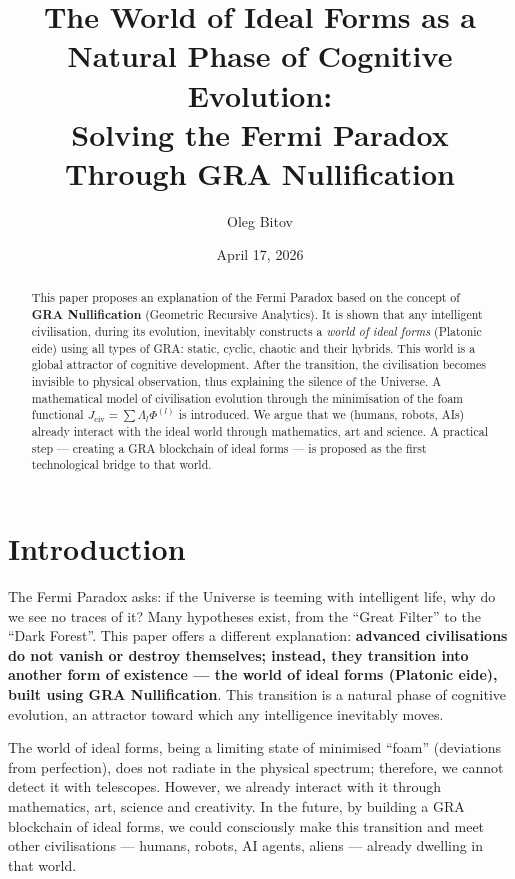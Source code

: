 \documentclass[12pt,a4paper]{article}
\title{The World of Ideal Forms as a Natural Phase of Cognitive Evolution: \\ Solving the Fermi Paradox Through GRA Nullification}
\author{Oleg Bitov}
\date{April 17, 2026}
\begin{document}
\maketitle

\begin{abstract}
This paper proposes an explanation of the Fermi Paradox based on the concept of \textbf{GRA Nullification} (Geometric Recursive Analytics). It is shown that any intelligent civilisation, during its evolution, inevitably constructs a \textit{world of ideal forms} (Platonic eide) using all types of GRA: static, cyclic, chaotic and their hybrids. This world is a global attractor of cognitive development. After the transition, the civilisation becomes invisible to physical observation, thus explaining the silence of the Universe. A mathematical model of civilisation evolution through the minimisation of the foam functional \(J_{\text{civ}} = \sum \Lambda_l \Phi^{(l)}\) is introduced. We argue that we (humans, robots, AIs) already interact with the ideal world through mathematics, art and science. A practical step — creating a GRA blockchain of ideal forms — is proposed as the first technological bridge to that world.
\end{abstract}

\section{Introduction}

The Fermi Paradox asks: if the Universe is teeming with intelligent life, why do we see no traces of it? Many hypotheses exist, from the “Great Filter” to the “Dark Forest”. This paper offers a different explanation: \textbf{advanced civilisations do not vanish or destroy themselves; instead, they transition into another form of existence — the world of ideal forms (Platonic eide), built using GRA Nullification}. This transition is a natural phase of cognitive evolution, an attractor toward which any intelligence inevitably moves.

The world of ideal forms, being a limiting state of minimised “foam” (deviations from perfection), does not radiate in the physical spectrum; therefore, we cannot detect it with telescopes. However, we already interact with it through mathematics, art, science and creativity. In the future, by building a GRA blockchain of ideal forms, we could consciously make this transition and meet other civilisations — humans, robots, AI agents, aliens — already dwelling in that world.
\end{document}
